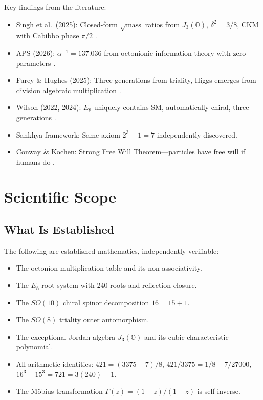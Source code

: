 \documentclass[11pt]{article}
\begin{document}
Key findings from the literature:
\begin{itemize}
\item Singh et al.\ (2025): Closed-form $\sqrt{\text{mass}}$ ratios from $J_3(\mathbb{O})$, $\delta^2 = 3/8$, CKM with Cabibbo phase $\pi/2$ \cite{singh2025j3}.
\item APS (2026): $\alpha^{-1} = 137.036$ from octonionic information theory with zero parameters \cite{aps2026alpha}.
\item Furey \& Hughes (2025): Three generations from triality, Higgs emerges from division algebraic multiplication \cite{furey2025generations}.
\item Wilson (2022, 2024): $E_8$ uniquely contains SM, automatically chiral, three generations \cite{wilson2022e8, wilson2024e8}.
\item Sankhya framework: Same axiom $2^3 - 1 = 7$ independently discovered.
\item Conway \& Kochen: Strong Free Will Theorem---particles have free will if humans do \cite{conway2009strong}.
\end{itemize}

\section{Scientific Scope}

\subsection{What Is Established}

The following are established mathematics, independently verifiable:
\begin{itemize}
\item The octonion multiplication table and its non-associativity.
\item The $E_8$ root system with 240 roots and reflection closure.
\item The $SO(10)$ chiral spinor decomposition $16 = 15 + 1$.
\item The $SO(8)$ triality outer automorphism.
\item The exceptional Jordan algebra $J_3(\mathbb{O})$ and its cubic characteristic polynomial.
\item All arithmetic identities: $421 = (3375-7)/8$, $421/3375 = 1/8 - 7/27000$, $16^3 - 15^3 = 721 = 3(240)+1$.
\item The M\"obius transformation $\Gamma(z) = (1-z)/(1+z)$ is self-inverse.
\end{itemize}
\end{document}
